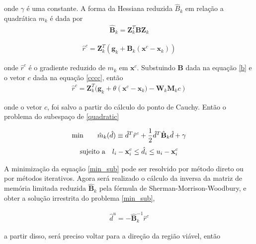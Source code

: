         onde $\gamma$ é uma constante. A forma da Hessiana reduzida $\hat{B}_{k}$ em relação a quadrática $m_{k}$  é dada por 
        \begin{eqnarray}
         \nonumber
         \hat{\mathbf{B}}_{k}= \mathbf{Z}^{T}_{k} \mathbf{B} \mathbf{Z}_{k}
        \end{eqnarray}
        
        \begin{eqnarray}
         \nonumber
         \hat{r}^{c} = \mathbf{Z}^{T}_{k} (\mathbf{g}_{k} +\mathbf{B}_{k}(\mathbf{x}^{c} -\mathbf{x}_{k}))
        \end{eqnarray}

        onde $\hat{r}^{c}$ é o gradiente reduzido de $m_{k}$ em $\mathbf{x}^{c}$. Substuindo $\mathbf{B}$ dada na equação \ref{b} e o vetor $c$ dada na equação \ref{cccc}, então 
        \begin{eqnarray}
         \hat{r}^{c} =\mathbf{Z}_{k}^{T} (\mathbf{g}_{k} + \theta \left(\mathbf{x}^{c} -\mathbf{x}_{k}) - \mathbf{W}_{k} \mathbf{M}_{k} c\right) 
        \end{eqnarray}
        
        onde o vetor $c$, foi  salvo a partir do cálculo do ponto de Cauchy. Então o problema do subespaço de \ref{quadratic}
    
\begin{eqnarray}
 \hbox{min}~~~~~~ \hat{m}_{k} (\hat{d}) \equiv \hat{d}^{T} \hat{r}^{c} + \frac{1}{2} \hat{d}^{T} \hat{\mathbf{B}}_{k}\hat{d} + \gamma
 \label{min_sub}
\end{eqnarray}
\vspace{-1.0cm}
\begin{eqnarray}
\label{limites}
 \hbox{sujeito a} ~~~l_{i}-\mathbf{x}_{i}^{c} \le \hat{d}_{i} \le u_{i} - \mathbf{x}_{i}^{c} 
\end{eqnarray}

          A minimização da equação \ref{min_sub} pode ser resolvido por método direto ou por métodos iterativos. Agora será realizado o cálculo da inversa  da matriz de memória limitada reduzida $\hat{\mathbf{B}}_{k}$ pela fórmula de Sherman-Morrison-Woodbury, e obter a solução irrestrita do problema \ref{min_sub}, 
          
          \begin{eqnarray}
          \label{sub}
           \hat{d}^{u} = - \hat{\mathbf{B}}_{k}^{-1} \hat{r}^{c} 
          \end{eqnarray}

          a partir disso, será preciso voltar para a direção da região viável, então 
          
